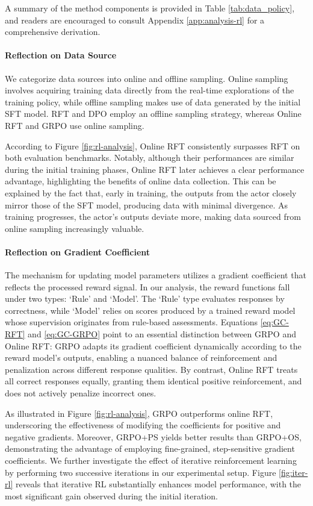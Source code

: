 A summary of the method components is provided in Table \ref{tab:data_policy}, and readers are encouraged to consult Appendix \ref{app:analysis-rl} for a comprehensive derivation.

\paragraph{Reflection on Data Source} We categorize data sources into online and offline sampling. Online sampling involves acquiring training data directly from the real-time explorations of the training policy, while offline sampling makes use of data generated by the initial SFT model. RFT and DPO employ an offline sampling strategy, whereas Online RFT and GRPO use online sampling.

According to Figure \ref{fig:rl-analysis}, Online RFT consistently surpasses RFT on both evaluation benchmarks. Notably, although their performances are similar during the initial training phases, Online RFT later achieves a clear performance advantage, highlighting the benefits of online data collection. This can be explained by the fact that, early in training, the outputs from the actor closely mirror those of the SFT model, producing data with minimal divergence. As training progresses, the actor's outputs deviate more, making data sourced from online sampling increasingly valuable.

\paragraph{Reflection on Gradient Coefficient} The mechanism for updating model parameters utilizes a gradient coefficient that reflects the processed reward signal. In our analysis, the reward functions fall under two types: `Rule' and `Model'. The `Rule' type evaluates responses by correctness, while `Model' relies on scores produced by a trained reward model whose supervision originates from rule-based assessments. Equations \ref{eq:GC-RFT} and \ref{eq:GC-GRPO} point to an essential distinction between GRPO and Online RFT: GRPO adapts its gradient coefficient dynamically according to the reward model's outputs, enabling a nuanced balance of reinforcement and penalization across different response qualities. By contrast, Online RFT treats all correct responses equally, granting them identical positive reinforcement, and does not actively penalize incorrect ones.

As illustrated in Figure \ref{fig:rl-analysis}, GRPO outperforms online RFT, underscoring the effectiveness of modifying the coefficients for positive and negative gradients. Moreover, GRPO+PS yields better results than GRPO+OS, demonstrating the advantage of employing fine-grained, step-sensitive gradient coefficients. We further investigate the effect of iterative reinforcement learning by performing two successive iterations in our experimental setup. Figure \ref{fig:iter-rl} reveals that iterative RL substantially enhances model performance, with the most significant gain observed during the initial iteration.

